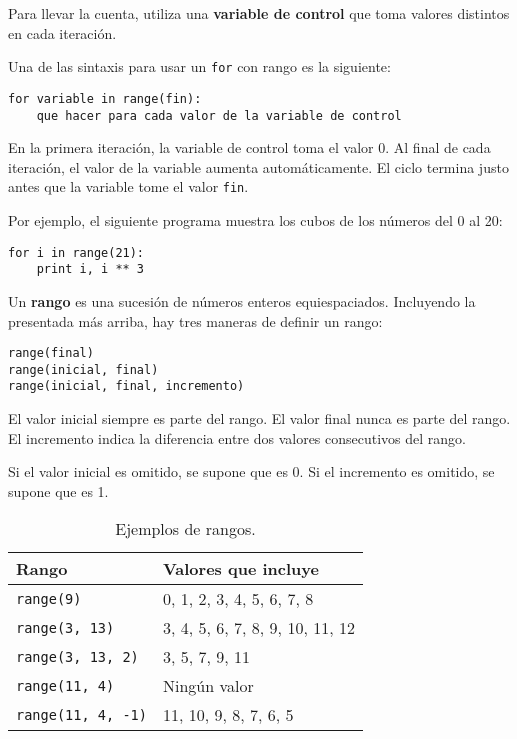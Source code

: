 Para llevar la cuenta, utiliza una \textbf{variable de control} que toma
valores distintos en cada iteración.

Una de las sintaxis para usar un \lstinline!for! con rango es la
siguiente:

\begin{lstlisting}
for variable in range(fin):
    que hacer para cada valor de la variable de control
\end{lstlisting}

En la primera iteración, la variable de control toma el valor 0. Al
final de cada iteración, el valor de la variable aumenta
automáticamente. El ciclo termina justo antes que la variable tome el
valor \lstinline!fin!.

Por ejemplo, el siguiente programa muestra los cubos de los números del
0 al 20:

\begin{lstlisting}
for i in range(21):
    print i, i ** 3
\end{lstlisting}

Un \textbf{rango} es una sucesión de números enteros equiespaciados.
Incluyendo la presentada más arriba, hay tres maneras de definir un
rango:

\begin{lstlisting}
range(final)
range(inicial, final)
range(inicial, final, incremento)
\end{lstlisting}

El valor inicial siempre es parte del rango. El valor final nunca es
parte del rango. El incremento indica la diferencia entre dos valores
consecutivos del rango.

Si el valor inicial es omitido, se supone que es 0. Si el incremento es
omitido, se supone que es 1.

\begin{table}
  \centering
  \begin{tabular}{ll}
    \toprule
      Rango                        & Valores que incluye \\
    \midrule
      \lstinline!range(9)!         & 0, 1, 2, 3, 4, 5, 6, 7, 8 \\
      \lstinline!range(3, 13)!     & 3, 4, 5, 6, 7, 8, 9, 10, 11, 12 \\
      \lstinline!range(3, 13, 2)!  & 3, 5, 7, 9, 11 \\
      \lstinline!range(11, 4)!     & Ningún valor \\
      \lstinline!range(11, 4, -1)! & 11, 10, 9, 8, 7, 6, 5 \\
    \bottomrule
  \end{tabular}
  \caption{Ejemplos de rangos.}
  \label{tbl:ejemplos-range}
\end{table}


